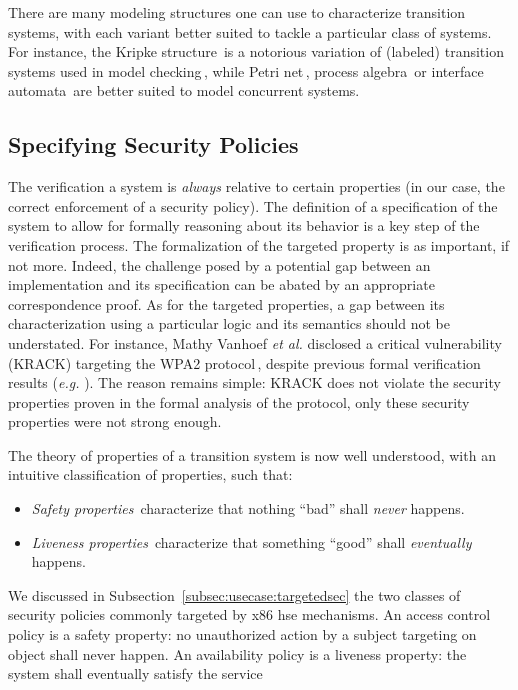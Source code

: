 \documentclass[oneside,a4paper]{memoir}
\theoremstyle{break}
\begin{document}
There are many modeling structures one can use to characterize transition
systems, with each variant better suited to tackle a particular class of
systems.
%
For instance, the Kripke structure\,\cite{kripke1971semantical} is a notorious
variation of (labeled) transition systems used in model
checking\,\cite{clarke1999model}, while Petri net\,\cite{peterson1981petri},
process algebra\,\cite{bergstra1984process} or interface
automata\,\cite{de2001interface} are better suited to model concurrent systems.

\subsection{Specifying Security Policies}
\label{sec:sota:security}

The verification a system is \emph{always} relative to certain properties (in
our case, the correct enforcement of a security policy).
%
The definition of a specification of the system to allow for formally reasoning
about its behavior is a key step of the verification process.
%
The formalization of the targeted property is as important, if not more.
%
Indeed, the challenge posed by a potential gap between an implementation and its
specification can be abated by an appropriate correspondence proof.
%
As for the targeted properties, a gap between its characterization using a
particular logic and its semantics should not be understated.
%
For instance, Mathy Vanhoef \emph{et al.} disclosed a critical vulnerability
(KRACK) targeting the WPA2 protocol\,\cite{vanhoef2017key}, despite previous
formal verification results (\emph{e.g.} \cite{he2004analysis}).
%
The reason remains simple: KRACK does not violate the security properties proven
in the formal analysis of the protocol, only these security properties were not
strong enough.

The theory of properties of a transition system is now well understood, with an
intuitive classification of properties, such that:
%
\begin{itemize}
\item \emph{Safety properties}\,\cite{lamport1977proving,lamport1985logical}
  characterize that nothing ``bad'' shall \emph{never} happens.
\item \emph{Liveness properties}\,\cite{lamport1985logical,alpern1985liveness}
  characterize that something ``good'' shall \emph{eventually} happens.
\end{itemize}

We discussed in Subsection~\ref{subsec:usecase:targetedsec} the two classes of
security policies commonly targeted by x86 \ac{hse} mechanisms.
%
An access control policy is a safety property: no unauthorized action by a
subject targeting on object shall never happen.
%
An availability policy is a liveness property: the system shall eventually
satisfy the service
\end{document}

